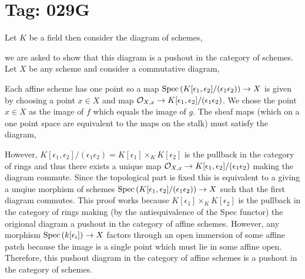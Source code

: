 \documentclass[12pt]{article}
\begin{document}
\section{Tag: 029G}

Let $K$ be a field then consider the diagram of schemes,
\begin{center}
\end{center}
we are asked to show that this diagram is a pushout in the category of schemes. Let $X$ be any scheme and consider a commutative diagram,
\begin{center}
\end{center}
Each affine scheme has one point so a map $\mathrm{Spec}\left( K[\epsilon_1, \epsilon_2]/(\epsilon_1 \epsilon_2) \right) \to X$ is given by choosing a point $x \in X$ and map $\mathcal{O}_{X, x} \to K[\epsilon_1, \epsilon_2]/(\epsilon_1 \epsilon_2)$. We chose the point $x \in X$ as the image of $f$ which equals the image of $g$. The sheaf maps (which on a one point space are equivalent to the maps on the stalk) must satisfy the diagram,
\begin{center}
\end{center}
However, $K[\epsilon_1, \epsilon_2] /(\epsilon_1 \epsilon_2) = K[\epsilon_1] \times_K K[\epsilon_2]$ is the pullback in the category of rings and thus there exists a unique map $\mathcal{O}_{X, x} \to K[\epsilon_1, \epsilon_2] /(\epsilon_1 \epsilon_2)$ making the diagram commute. Since the topological part is fixed this is equivalent to a giving a unqiue morphism of schemes $\mathrm{Spec}\left( K[\epsilon_1, \epsilon_2] /(\epsilon_1 \epsilon_2) \right) \to X$ such that the first diagram commutes. This proof works because  $K[\epsilon_1] \times_K K[\epsilon_2]$ is the pullback in the category of rings making (by the antiequivalence of the Spec functor) the origional diagram a pushout in the category of affine schemes. However, any morphism $\mathrm{Spec}\left( k[\epsilon_i] \right) \to X$ factors through an open immersion of some affine patch because the image is a single point which must lie in some affine open. Therefore, this pushout diagram in the category of affine schemes is a pushout in the category of schemes.  
\end{document}
